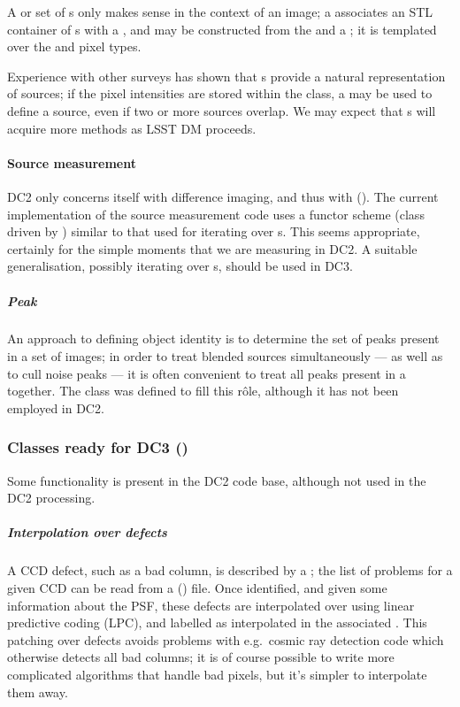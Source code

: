 A  or set of s only makes sense
in the context of an image;  a  associates
an STL container of s with a ,
and may be constructed from the  and a ;
it is templated over the  and  pixel types.

Experience with other surveys has shown that s provide
a natural representation of sources;  if the pixel intensities are
stored within the class, a  may be used to define
a source, even if two or more sources overlap.  We may expect that
s will acquire more methods as LSST DM proceeds.


\paragraph{Source measurement}

DC2 only concerns itself with difference imaging, and thus with
 ().  The current implementation of the source
measurement code uses a functor scheme (class
 driven by ) similar to that
used for iterating over s.  This seems appropriate,
certainly for the simple moments that we are measuring in DC2. A
suitable generalisation, possibly iterating over s,
should be used in DC3.

\subparagraph{Peak}
An approach to defining object identity is to determine the set
of peaks present in a set of images;  in order to treat blended
sources simultaneously --- as well as to cull noise peaks --- it
is often convenient to treat all peaks present in a 
together.  The class  was defined to fill this r\^ole,
although it has not been employed in DC2.  

\subsubsection{Classes ready for DC3 ()}

Some functionality is present in the DC2 code base,
although not used in the DC2 processing.

\subparagraph{Interpolation over defects}
A CCD defect, such as a bad column, is described by a ;
the list of problems for a given CCD can be read from a 
() file.  Once identified, and given some information
about the PSF,  these defects are interpolated over using linear
predictive coding (LPC), and labelled as interpolated in the
associated .  This patching over defects avoids problems with
e.g.~cosmic ray detection code which otherwise detects all bad columns;
it is of course possible to write more complicated algorithms that
handle bad pixels, but it's simpler to interpolate them away.

